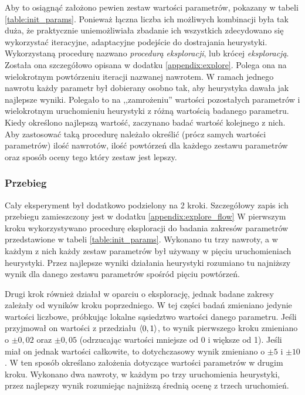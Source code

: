 \documentclass[./FM_mgr.tex]{subfiles}
\begin{document}
Aby to osiągnąć założono pewien zestaw wartości parametrów, pokazany w tabeli \ref{table:init_params}.
Ponieważ łączna liczba ich możliwych kombinacji była tak duża, że praktycznie uniemożliwiała zbadanie ich wszystkich zdecydowano się wykorzystać iteracyjne, adaptacyjne podejście do dostrajania heurystyki.
Wykorzystaną procedurę nazwano \emph{procedurą eksploracji}, lub krócej \emph{eksploracją}.
Została ona szczegółowo opisana w dodatku \ref{appendix:explore}.
Polega ona na wielokrotnym powtórzeniu iteracji nazwanej nawrotem.
W ramach jednego nawrotu każdy parametr był dobierany osobno tak, aby heurystyka dawała jak najlepsze wyniki.
Polegało to na ,,zamrożeniu'' wartości pozostałych parametrów i wielokrotnym uruchomieniu heurystyki z różną wartością badanego parametru.
Kiedy określono najlepszą wartość, zaczynano badać wartość kolejnego z nich.
Aby zastosować taką procedurę należało określić (prócz samych wartości parametrów) ilość nawrotów, ilość powtórzeń dla każdego zestawu parametrów oraz sposób oceny tego który zestaw jest lepszy.

\subsubsection*{Przebieg}
Cały eksperyment był dodatkowo podzielony na 2 kroki. 
Szczegółowy zapis ich przebiegu zamieszczony jest w dodatku \ref{appendix:explore_flow}
W pierwszym kroku wykorzystywano procedurę eksploracji do badania zakresów parametrów przedstawione w tabeli \ref{table:init_params}.
Wykonano tu trzy nawroty, a w każdym z nich każdy zestaw parametrów był używany w pięciu uruchomieniach heurystyki.
Przez najlepsze wyniki działania heurystyki rozumiano tu najniższy wynik dla danego zestawu parametrów spośród pięciu powtórzeń.

Drugi krok również działał w oparciu o eksplorację, jednak badane zakresy  zależały od wyników kroku poprzedniego.
W tej części badań zmieniano jedynie wartości liczbowe, próbkując lokalne sąsiedztwo wartości danego parametru.
Jeśli przyjmował on wartości z przedziału $\langle0, 1\rangle$, to wynik pierwszego kroku zmieniano o $\pm0,02$ oraz $\pm0,05$ (odrzucając wartości mniejsze od 0 i większe od 1).
Jeśli miał on jednak wartości całkowite, to dotychczasowy wynik zmieniano o $\pm5$ i $\pm10$.
W ten sposób określano założenia dotyczące wartości parametrów w drugim kroku.
Wykonano dwa nawroty, w każdym po trzy uruchomienia heurystyki, przez najlepszy wynik rozumiejąc najniższą średnią ocenę z trzech uruchomień.
\end{document}
